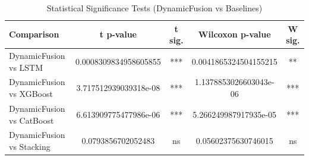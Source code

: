 \begin{table}[htbp]
\centering
\caption{Statistical Significance Tests (DynamicFusion vs Baselines)}
\label{tab:significance}
\begin{tabular}{lcccc}
\hline
Comparison & t p-value & t sig. & Wilcoxon p-value & W sig. \\
\hline
DynamicFusion vs LSTM & 0.0008309834958605855 & *** & 0.0041865324504155215 & ** \\
DynamicFusion vs XGBoost & 3.717512939039318e-08 & *** & 1.1378853026603043e-06 & *** \\
DynamicFusion vs CatBoost & 6.613909775477986e-06 & *** & 5.266249987917935e-05 & *** \\
DynamicFusion vs Stacking & 0.0793856702052483 & ns & 0.05602375630746015 & ns \\
\hline
\end{tabular}
\end{table}

